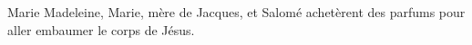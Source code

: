 \encetemps Marie Madeleine, Marie, mère de Jacques, et Salomé
		achetèrent des parfums pour aller embaumer le corps de Jésus.
